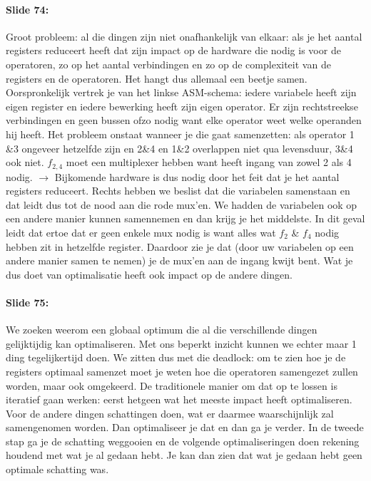 \documentclass[10pt,a4paper]{book}
\begin{document}
\paragraph{Slide 74:} Groot probleem: al die dingen zijn niet onafhankelijk van elkaar: als je het aantal registers reduceert heeft dat zijn impact op de hardware die nodig is voor de operatoren, zo op het aantal verbindingen en zo op de complexiteit van de registers en de operatoren. Het hangt dus allemaal een beetje samen. \\
Oorspronkelijk vertrek je van het linkse ASM-schema: iedere variabele heeft zijn eigen register en iedere bewerking heeft zijn eigen operator. 
Er zijn rechtstreekse verbindingen en geen bussen ofzo nodig want elke operator weet welke operanden hij heeft. Het probleem onstaat wanneer je die gaat samenzetten: als operator 1 \&3 ongeveer hetzelfde zijn en 2\&4 en 1\&2 overlappen niet qua levensduur, 3\&4 ook niet. $f_{2,4}$  moet een multiplexer hebben want heeft ingang van zowel 2 als 4 nodig. $\rightarrow$ Bijkomende hardware is dus nodig door het feit dat je het aantal registers reduceert. Rechts hebben we beslist dat die variabelen samenstaan en dat leidt dus tot de nood aan die rode mux'en. We hadden de variabelen ook op een andere manier kunnen samennemen en dan krijg je het middelste. In dit geval leidt dat ertoe dat er geen enkele mux nodig is want alles wat $f_2$ \& $f_4$ nodig hebben zit in hetzelfde register. Daardoor zie je dat (door uw variabelen op een andere manier samen te nemen) je de mux'en aan de ingang kwijt bent. Wat je dus doet van optimalisatie heeft ook impact op de andere dingen.

\paragraph{Slide 75:} We zoeken weerom een globaal optimum die al die verschillende dingen gelijktijdig kan optimaliseren. Met ons beperkt inzicht kunnen we echter maar 1 ding tegelijkertijd doen. We zitten dus met die deadlock: om te zien hoe je de registers optimaal samenzet moet je weten hoe die operatoren samengezet zullen worden, maar ook omgekeerd. De traditionele manier om dat op te lossen is iteratief gaan werken: eerst hetgeen wat het meeste impact heeft optimaliseren. Voor de andere dingen schattingen doen, wat er daarmee waarschijnlijk zal samengenomen worden. Dan optimaliseer je dat en dan ga je verder. In de tweede stap ga je de schatting weggooien en de volgende optimaliseringen doen rekening houdend met wat je al gedaan hebt. Je kan dan zien dat wat je gedaan hebt geen optimale schatting was. 
\end{document}
